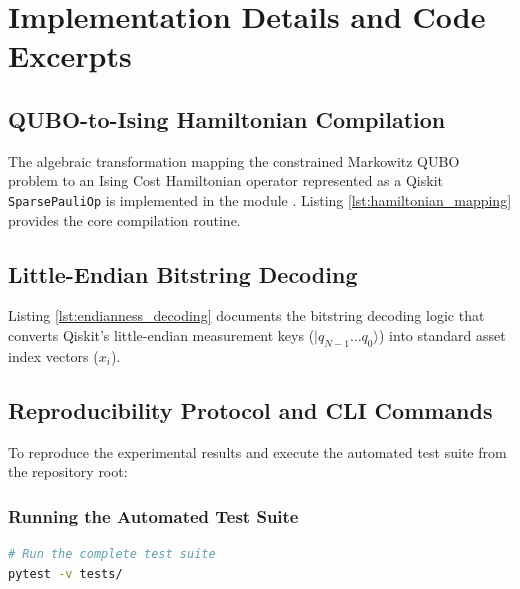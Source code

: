 \chapter{Implementation Details and Code Excerpts}
\label{app:implementation-details}

\section{QUBO-to-Ising Hamiltonian Compilation}
The algebraic transformation mapping the constrained Markowitz QUBO problem to an Ising Cost Hamiltonian operator represented as a Qiskit \texttt{SparsePauliOp} is implemented in the module . Listing \ref{lst:hamiltonian_mapping} provides the core compilation routine.



\section{Little-Endian Bitstring Decoding}
Listing \ref{lst:endianness_decoding} documents the bitstring decoding logic that converts Qiskit's little-endian measurement keys ($|q_{N-1} \dots q_0\rangle$) into standard asset index vectors ($x_i$).



\section{Reproducibility Protocol and CLI Commands}
To reproduce the experimental results and execute the automated test suite from the repository root:

\subsection{Running the Automated Test Suite}
\begin{lstlisting}[language=bash, basicstyle=\ttfamily\small, frame=single]
# Run the complete test suite
pytest -v tests/
\end{lstlisting}

